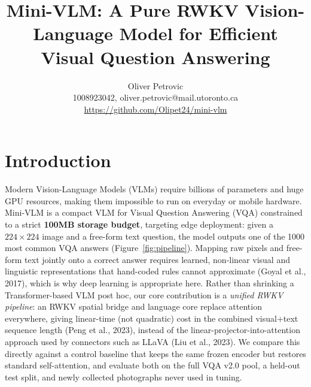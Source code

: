 \documentclass[final]{article}
\title{Mini-VLM: A Pure RWKV Vision-Language Model for Efficient Visual Question Answering}
\author{%
  Oliver Petrovic \\
  1008923042, oliver.petrovic@mail.utoronto.ca\\
  \url{https://github.com/Olipet24/mini-vlm}\\
}
\begin{document}
\maketitle

\vspace{-0.5in}

\section*{Introduction}

Modern Vision-Language Models (VLMs) require billions of parameters and huge GPU resources,
making them impossible to run on everyday or mobile hardware. Mini-VLM is a compact VLM for
Visual Question Answering (VQA) constrained to a strict \textbf{100MB storage budget}, targeting
edge deployment: given a $224\times224$ image and a free-form text question, the model outputs one
of the 1000 most common VQA answers (Figure~\ref{fig:pipeline}). Mapping raw pixels and free-form
text jointly onto a correct answer requires learned, non-linear visual and linguistic
representations that hand-coded rules cannot approximate (Goyal et al., 2017), which is why deep
learning is appropriate here. Rather than shrinking a Transformer-based VLM post hoc, our core
contribution is a \emph{unified RWKV pipeline}: an RWKV spatial bridge and language core replace
attention everywhere, giving linear-time (not quadratic) cost in the combined visual+text sequence
length (Peng et al., 2023), instead of the linear-projector-into-attention approach used by
connectors such as LLaVA (Liu et al., 2023). We compare this directly against a control baseline
that keeps the same frozen encoder but restores standard self-attention, and evaluate both on the
full VQA v2.0 pool, a held-out test split, and newly collected photographs never used in tuning.
\end{document}
